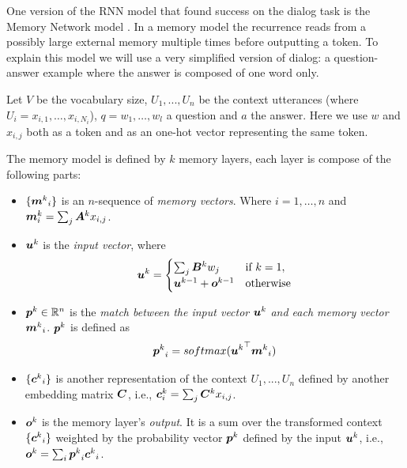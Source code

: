One version of the RNN model that found success on the dialog task is the Memory Network model \cite{SukhbaatarSWF15}. In a memory model the recurrence reads from a possibly large external memory multiple times before outputting a token. To explain this model we will use a very simplified version of dialog: a question-answer example where the answer is composed of one word only. 

Let $V$ be the vocabulary size, $U_1, ..., U_n$ be the context utterances (where $U_i = x_{i,1} , \dots, x_{i,N_{i}} $), $q = w_{1} , \dots, w_{l} $ a question and $a$ the answer. Here we use $w$ and $x_{i,j}$ both as a token and as an one-hot vector representing the same token.

The memory model is defined by $k$ memory layers, each layer is compose of the following parts:


\begin{itemize}
\item $\{ {\bm{m}^{k}}_i\}$ is an $n$-sequence of \textit{memory vectors}. Where $i = 1, \dots, n$ and $\bm{m}^{k}_i = \sum_{j} \bm{A}^{k}x_{i,j}$.
\item  $\bm{u}^{k}$ is the \textit{input vector}, where
\begin{equation}
\bm{u}^{k}=
\begin{cases}
\sum_{j} \bm{B}^{k}w_{j} & \text{if } k=1, \\
\bm{u}^{k-1} + \bm{o}^{k-1}  & \text{otherwise}\\
\end{cases}
\end{equation}
\item $\bm{p}^{k} \in \mathbb{R}^{n}$ is the \textit{match between the input vector} $\bm{u}^{k}$ \textit{and each memory vector} ${\bm{m}^{k}}_i$. $\bm{p}^{k}$ is defined as
\begin{equation}
{\bm{p}^{k}}_i = softmax({\bm{u}^{k}}^{\top} {\bm{m}^{k}}_i) 
\end{equation}
\item $\{ {\bm{c}^{k}}_i\}$ is another representation of the context $U_1, ..., U_n$ defined by another embedding matrix $\bm{C}$, i.e., $\bm{c}^{k}_i = \sum_{j} \bm{C}^{k}x_{i,j}$.
\item $\bm{o}^{k}$ is the memory layer's  \textit{output}. It is a sum over the transformed context $\{ {\bm{c}^{k}}_i\}$ weighted by the probability vector $\bm{p}^{k}$ defined by the input $\bm{u}^{k}$, i.e.,  $\bm{o}^{k}= \sum_{i} {\bm{p}^{k}}_i {\bm{c}^{k}}_i$.
\end{itemize}

